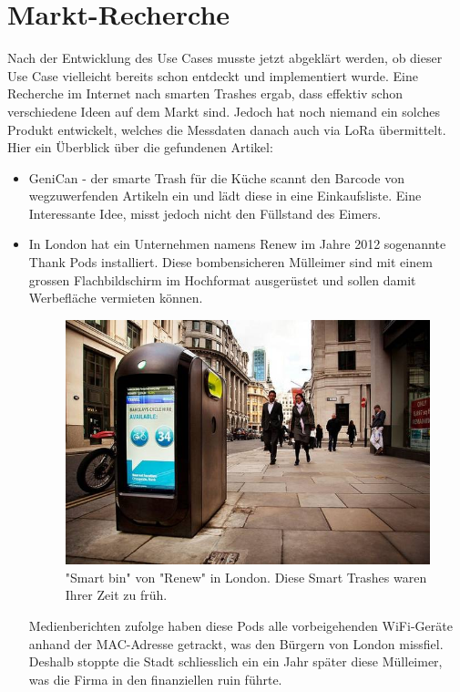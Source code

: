 \section{Markt-Recherche}
Nach der Entwicklung des Use Cases musste jetzt abgeklärt werden, ob dieser Use Case vielleicht bereits schon entdeckt und implementiert wurde. Eine Recherche im Internet nach smarten Trashes ergab, dass effektiv schon verschiedene Ideen auf dem Markt sind. Jedoch hat noch niemand ein solches Produkt entwickelt, welches die Messdaten danach auch via LoRa übermittelt. Hier ein Überblick über die gefundenen Artikel:
\begin{itemize}  
  \item GeniCan\autocite{market:genican} - der smarte Trash für die Küche scannt den Barcode von wegzuwerfenden Artikeln ein und lädt diese in eine Einkaufsliste. Eine Interessante Idee, misst jedoch nicht den Füllstand des Eimers.
  \item In London hat ein Unternehmen namens \glqq{}Renew\grqq{} im Jahre 2012 sogenannte \glqq{}Thank Pods\grqq{}\autocite{market:LondonBins} installiert. Diese bombensicheren Mülleimer sind mit einem grossen Flachbildschirm im Hochformat ausgerüstet und sollen damit Werbefläche vermieten können. 
   \begin{figure}[H]
     \centering
        \includegraphics[scale=0.5]{pictures/London_Thank_Pod_Renew.jpg}
    \caption{"Smart bin" von "Renew" in London. Diese Smart Trashes waren Ihrer Zeit zu früh.}
    \label{fig:LondonSmartBin}
\end{figure} 
Medienberichten zufolge haben diese Pods alle vorbeigehenden WiFi-Geräte anhand der MAC-Adresse getrackt, was den Bürgern von London missfiel. Deshalb stoppte die Stadt schliesslich ein  ein Jahr später diese Mülleimer\autocite{market:LondonBinsStop}, was die Firma in den finanziellen ruin führte\autocite{market:LondonBinRuin}.

\end{itemize}
